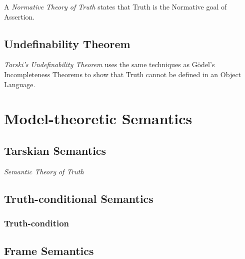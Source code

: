 A \emph{Normative Theory of Truth} states that Truth is the Normative
goal of Assertion.



\subsection{Undefinability Theorem}\label{sec:undefinability_theorem}

\emph{Tarski's Undefinability Theorem} \cite{tarski36} uses the same
techniques as G\"odel's Incompleteness Theorems to show that Truth
cannot be defined in an Object Language.



\section{Model-theoretic Semantics}\label{sec:model_semantics}

\subsection{Tarskian Semantics}\label{sec:tarski_semantics}

\emph{Semantic Theory of Truth}



\subsection{Truth-conditional Semantics}
\label{sec:truth_conditional_semantics}

\subsubsection{Truth-condition}\label{sec:truth_condition}



\subsection{Frame Semantics}\label{sec:frame_semantics}

